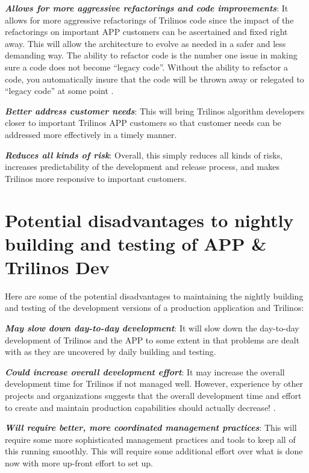 \documentclass[pdf,ps2pdf,11pt]{SANDreport}
\begin{document}
{}\textit{\textbf{Allows for more aggressive refactorings and code improvements}}:
It allows for more aggressive refactorings of Trilinos code since the impact
of the refactorings on important APP customers can be ascertained and fixed
right away.  This will allow the architecture to evolve as needed in a safer
and less demanding way.  The ability to refactor code is the number one issue
in making sure a code does not become ``legacy code''.  Without the ability to
refactor a code, you automatically insure that the code will be thrown away or
relegated to ``legacy code'' at some point {}\cite{book:code-complete-2}.

{}\textit{\textbf{Better address customer needs}}: This will bring Trilinos
algorithm developers closer to important Trilinos APP customers so that
customer needs can be addressed more effectively in a timely manner.

{}\textit{\textbf{Reduces all kinds of risk}}: Overall, this simply reduces all
kinds of risks, increases predictability of the development and release
process, and makes Trilinos more responsive to important customers.


%
{}\section{Potential disadvantages to nightly building and testing of APP \&
Trilinos Dev}
%

Here are some of the potential disadvantages to maintaining the nightly
building and testing of the development versions of a production application
and Trilinos:

{}\textit{\textbf{May slow down day-to-day development}}: It will slow down the
day-to-day development of Trilinos and the APP to some extent in that problems
are dealt with as they are uncovered by daily building and testing.

{}\textit{\textbf{Could increase overall development effort}}: It may increase the
overall development time for Trilinos if not managed well.  However,
experience by other projects and organizations suggests that the overall
development time and effort to create and maintain production capabilities
should actually decrease! {}\cite{book:code-complete-2}.

{}\textit{\textbf{Will require better, more coordinated management practices}}:
This will require some more sophisticated management practices and tools to
keep all of this running smoothly.  This will require some additional effort
over what is done now with more up-front effort to set up.
\end{document}
